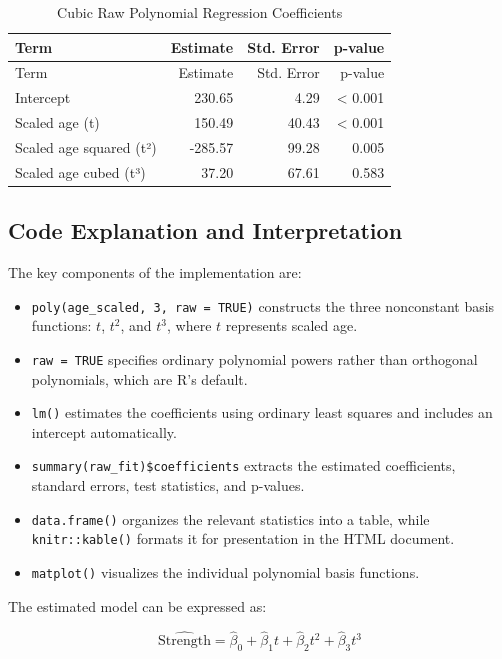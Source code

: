 \documentclass[
  letterpaper,
  DIV=11,
  numbers=noendperiod]{scrreprt}
\providecommand{\tightlist}{%
  \setlength{\itemsep}{0pt}\setlength{\parskip}{0pt}}
\begin{document}
\begin{longtable}[]{@{}lrrr@{}}
\caption{Cubic Raw Polynomial Regression Coefficients}\tabularnewline
\toprule\noalign{}
Term & Estimate & Std. Error & p-value \\
\midrule\noalign{}
\endfirsthead
\toprule\noalign{}
Term & Estimate & Std. Error & p-value \\
\midrule\noalign{}
\endhead
\bottomrule\noalign{}
\endlastfoot
Intercept & 230.65 & 4.29 & \textless{} 0.001 \\
Scaled age (t) & 150.49 & 40.43 & \textless{} 0.001 \\
Scaled age squared (t²) & -285.57 & 99.28 & 0.005 \\
Scaled age cubed (t³) & 37.20 & 67.61 & 0.583 \\
\end{longtable}

\subsection{Code Explanation and
Interpretation}\label{code-explanation-and-interpretation}

The key components of the implementation are:

\begin{itemize}
\tightlist
\item
  \texttt{poly(age\_scaled,\ 3,\ raw\ =\ TRUE)} constructs the three
  nonconstant basis functions: \(t\), \(t^2\), and \(t^3\), where \(t\)
  represents scaled age.
\item
  \texttt{raw\ =\ TRUE} specifies ordinary polynomial powers rather than
  orthogonal polynomials, which are R's default.
\item
  \texttt{lm()} estimates the coefficients using ordinary least squares
  and includes an intercept automatically.
\item
  \texttt{summary(raw\_fit)\$coefficients} extracts the estimated
  coefficients, standard errors, test statistics, and p-values.
\item
  \texttt{data.frame()} organizes the relevant statistics into a table,
  while \texttt{knitr::kable()} formats it for presentation in the HTML
  document.
\item
  \texttt{matplot()} visualizes the individual polynomial basis
  functions.
\end{itemize}

The estimated model can be expressed as:

\[
\widehat{\text{Strength}}
=\hat\beta_0+\hat\beta_1t+\hat\beta_2t^2+\hat\beta_3t^3
\]
\end{document}
